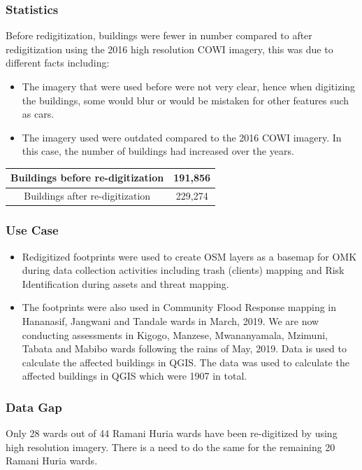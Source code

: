 \documentclass[a4paper,12pt,twoside]{article}
\begin{document}
\subsubsection{Statistics}
Before redigitization, buildings were fewer in number compared to after redigitization using the 2016 high resolution COWI imagery, this was due to different facts including: 
\begin{itemize}
	\item The imagery that were used before were not very clear, hence when digitizing the buildings, some would blur or would be mistaken for other features such as cars.
	\item The imagery used were outdated compared to the 2016 COWI imagery. In this case, the number of buildings had increased over the years.
\end{itemize}
\begin{center}
\begin{tabular}{|c|c|}
\hline
   Buildings before re-digitization & 191,856 \\
\hline
   Buildings after re-digitization & 229,274 \\
\hline
\end{tabular}
\end{center}

\subsubsection{Use Case}
\begin{itemize}
	\item Redigitized footprints were used to create OSM layers as a basemap for OMK during data collection activities including trash (clients) mapping and Risk Identification during assets and threat mapping. 
	\item The footprints were also used in Community Flood Response mapping in Hananasif, Jangwani and Tandale wards in March, 2019. We are now conducting assessments in Kigogo, Manzese, Mwananyamala, Mzimuni, Tabata and Mabibo wards following the rains of May, 2019. Data is used to calculate the affected buildings in QGIS. The data was used to calculate the affected buildings in QGIS which were 1907 in total.
\end{itemize}

\subsubsection{Data Gap}
Only 28 wards out of 44 Ramani Huria wards have been re-digitized by using high resolution imagery. There is a need to do the same for the remaining 20 Ramani Huria wards.
\end{document}
